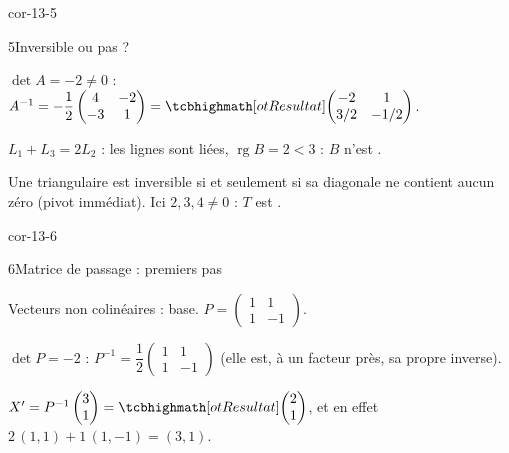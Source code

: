 \begin{blocLivre}{cor-13-5}
\begin{corrige}{5}{Inversible ou pas ?}
\begin{questions}
  \item $\det A=-2\neq0$ :
    $A^{-1}=-\dfrac12\begin{pmatrix}4&-2\\-3&1\end{pmatrix}
    =\res{\begin{pmatrix}-2&1\\3/2&-1/2\end{pmatrix}}$.
  \item $L_1+L_3=2L_2$ : les lignes sont liées, $\operatorname{rg}B=2<3$ :
    $B$ n'est .
  \item Une triangulaire est inversible si et seulement si sa diagonale ne
    contient aucun zéro (pivot immédiat). Ici $2,3,4\neq0$ : $T$ est
    .
\end{questions}
\end{corrige}
\end{blocLivre}

\begin{blocLivre}{cor-13-6}
\begin{corrige}{6}{Matrice de passage : premiers pas}
\begin{questions}
  \item Vecteurs non colinéaires : base. $P=\begin{pmatrix}1&1\\1&-1\end{pmatrix}$.
  \item $\det P=-2$ :
    $P^{-1}=\dfrac12\begin{pmatrix}1&1\\1&-1\end{pmatrix}$ (elle est, à un
    facteur près, sa propre inverse).
  \item $X'=P^{-1}\begin{pmatrix}3\\1\end{pmatrix}
    =\res{\begin{pmatrix}2\\1\end{pmatrix}}$, et en effet
    $2\,(1,1)+1\,(1,-1)=(3,1)$.
\end{questions}
\end{corrige}
\end{blocLivre}


